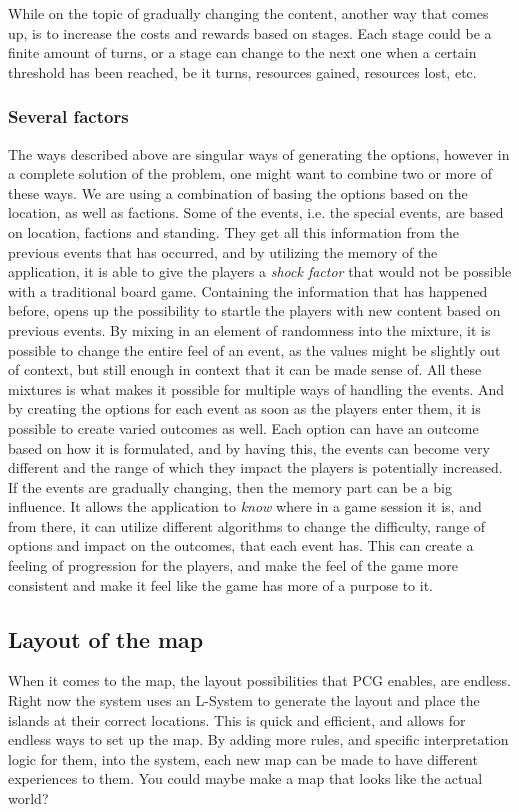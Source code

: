While on the topic of gradually changing the content, another way that comes up, is to increase the costs and rewards based on stages.
Each stage could be a finite amount of turns, or a stage can change to the next one when a certain threshold has been reached, be it turns, resources gained, resources lost, etc.

\subsubsection{Several factors}
The ways described above are singular ways of generating the options, however in a complete solution of the problem, one might want to combine two or more of these ways. 
We are using a combination of basing the options based on the location, as well as factions. Some of the events, i.e. the special events, are based on location, factions and standing. They get all this information from the previous events that has occurred, and by utilizing the memory of the application, it is able to give the players a \textit{shock factor} that would not be possible with a traditional board game. Containing the information that has happened before, opens up the possibility to startle the players with new content based on previous events. 
By mixing in an element of randomness into the mixture, it is possible to change the entire feel of an event, as the values might be slightly out of context, but still enough in context that it can be made sense of. All these mixtures is what makes it possible for multiple ways of handling the events. And by creating the options for each event as soon as the players enter them, it is possible to create varied outcomes as well. Each option can have an outcome based on how it is formulated, and by having this, the events can become very different and the range of which they impact the players is potentially increased. 
If the events are gradually changing, then the memory part can be a big influence. It allows the application to \textit{know} where in a game session it is, and from there, it can utilize different algorithms to change the difficulty, range of options and impact on the outcomes, that each event has. This can create a feeling of progression for the players, and make the feel of the game more consistent and make it feel like the game has more of a purpose to it.





\subsection{Layout of the map}
When it comes to the map, the layout possibilities that PCG enables, are endless. Right now the system uses an L-System to generate the layout and place the islands at their correct locations. This is quick and efficient, and allows for endless ways to set up the map. By adding more rules, and specific interpretation logic for them, into the system, each new map can be made to have different experiences to them. You could maybe make a map that looks like the actual world? 

